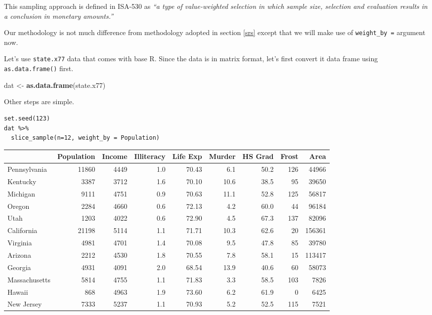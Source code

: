 \documentclass[
]{book}
\newenvironment{Shaded}{\begin{snugshade}}{\end{snugshade}}
\newcommand{\FunctionTok}[1]{\textcolor[rgb]{0.13,0.29,0.53}{\textbf{#1}}}
\newcommand{\NormalTok}[1]{#1}
\newcommand{\OtherTok}[1]{\textcolor[rgb]{0.56,0.35,0.01}{#1}}
\begin{document}
This sampling approach is defined in ISA-530 as \emph{``a type of value-weighted selection in which sample size, selection and evaluation results in a conclusion in monetary amounts.''}

Our methodology is not much difference from methodology adopted in section \ref{srs} except that we will make use of \texttt{weight\_by\ =} argument now.

Let's use \texttt{state.x77} data that comes with base R. Since the data is in matrix format, let's first convert it data frame using \texttt{as.data.frame()} first.

\begin{Shaded}
\begin{Highlighting}[]
\NormalTok{dat }\OtherTok{\textless{}{-}} \FunctionTok{as.data.frame}\NormalTok{(state.x77)}
\end{Highlighting}
\end{Shaded}

Other steps are simple.

\begin{verbatim}
set.seed(123)
dat %>% 
  slice_sample(n=12, weight_by = Population)
\end{verbatim}

\begin{tabular}{l|r|r|r|r|r|r|r|r}
\hline
  & Population & Income & Illiteracy & Life Exp & Murder & HS Grad & Frost & Area\\
\hline
Pennsylvania & 11860 & 4449 & 1.0 & 70.43 & 6.1 & 50.2 & 126 & 44966\\
\hline
Kentucky & 3387 & 3712 & 1.6 & 70.10 & 10.6 & 38.5 & 95 & 39650\\
\hline
Michigan & 9111 & 4751 & 0.9 & 70.63 & 11.1 & 52.8 & 125 & 56817\\
\hline
Oregon & 2284 & 4660 & 0.6 & 72.13 & 4.2 & 60.0 & 44 & 96184\\
\hline
Utah & 1203 & 4022 & 0.6 & 72.90 & 4.5 & 67.3 & 137 & 82096\\
\hline
California & 21198 & 5114 & 1.1 & 71.71 & 10.3 & 62.6 & 20 & 156361\\
\hline
Virginia & 4981 & 4701 & 1.4 & 70.08 & 9.5 & 47.8 & 85 & 39780\\
\hline
Arizona & 2212 & 4530 & 1.8 & 70.55 & 7.8 & 58.1 & 15 & 113417\\
\hline
Georgia & 4931 & 4091 & 2.0 & 68.54 & 13.9 & 40.6 & 60 & 58073\\
\hline
Massachusetts & 5814 & 4755 & 1.1 & 71.83 & 3.3 & 58.5 & 103 & 7826\\
\hline
Hawaii & 868 & 4963 & 1.9 & 73.60 & 6.2 & 61.9 & 0 & 6425\\
\hline
New Jersey & 7333 & 5237 & 1.1 & 70.93 & 5.2 & 52.5 & 115 & 7521\\
\hline
\end{tabular}
\end{document}
